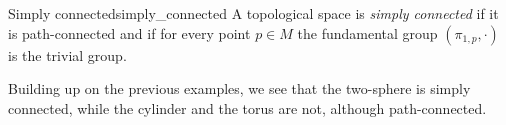 \begin{definition}{Simply connected}{simply_connected}
    A topological space  is \emph{simply connected} if it is path-connected and if for every point \(p \in M\) the fundamental group \((\pi_{1,p}, \cdot)\) is the trivial group.
\end{definition}
\begin{remark}
    Building up on the previous examples, we see that the two-sphere is simply connected, while the cylinder and the torus are not, although path-connected.
\end{remark}
